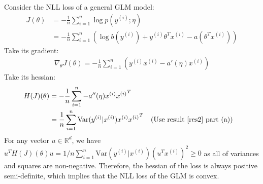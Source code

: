 \begin{answer}
Consider the NLL loss of a general GLM model:
\begin{align}
	J(\theta) &= - \frac{1}{n} \sum \limits_{i = 1}^{n} \log p(y^{(i)}; \eta) \\
	&= - \frac{1}{n} \sum \limits_{i = 1}^{n} \left( \log b(y^{(i)}) + y^{(i)} \theta^T x^{(i)} - a(\theta^T x^{(i)}) \right)
\end{align}
Take its gradient:
\begin{align}
	\nabla_{\theta}J(\theta) = - \frac{1}{n} \sum \limits_{i = 1}^{n} \left(y^{(i)} x^{(i)} - a'(\eta) x^{(i)} \right)
\end{align}
Take its hessian:
\begin{align}
	H(J)(\theta) &= - \frac{1}{n} \sum \limits_{i = 1}^{n} -a''(\eta) x^{(i)} {x^{(i)}}^T \\
	&= \frac{1}{n} \sum \limits_{i = 1}^{n} \text{Var}(y^{(i)}|x^{(i)}) x^{(i)} {x^{(i)}}^T && \text{(Use result \eqref{res2} part (a))}
\end{align}
For any vector $u \in \mathbb{R}^d$, we have $u^T H(J)(\theta) u = 1/n \sum _{i = 1}^{n} \text{Var}(y^{(i)}|x^{(i)}) (u^T x^{(i)})^2 \ge 0$ as all of variances and squares are non-negative. Therefore, the hessian of the loss is always positive semi-definite, which implies that the NLL loss of the GLM is convex. \\
\end{answer}
